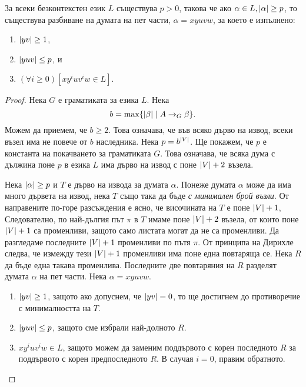 \begin{lemma}
  \label{lem:pumping-context} 
  За всеки безконтекстен език $L$ съществува $p>0$, такова
  че ако $\alpha\in L, \lvert{\alpha}\rvert \geq p$, то съществува разбиване на думата на пет части, $\alpha=xyuvw$,
  за което е изпълнено:
  \begin{enumerate}[1)]
  \item
    $\lvert{yv}\rvert\geq 1$,
  \item
    $\lvert{yuv}\rvert\leq p$, и
  \item
    $(\forall i\geq 0)[xy^iuv^iw\in L]$.
\end{enumerate}
\end{lemma}
\begin{proof}
  Нека $G$ е граматиката за езика $L$.
  Нека \[b = \max\{\lvert{\beta}\rvert \mid A\rightarrow_G \beta\}.\]
  Можем да приемем, че $b \geq 2$.
  Това означава, че във всяко дърво на извод, всеки възел има
  не повече от $b$ наследника.
  Нека $p = b^{\lvert{V}\rvert}$. Ще покажем, че $p$ е константа на покачването за граматиката $G$.
  Това означава, че всяка дума с дължина поне $p$ в езика $L$ има дърво на извод с поне $\lvert{V}\rvert + 2$ възела.
  
  Нека $\lvert{\alpha}\rvert \geq p$ и $T$ е дърво на извода за думата $\alpha$.
  Понеже думата $\alpha$ може да има много дървета на извод, нека $T$ също така да бъде {\em с минимален брой възли}. 
  От направените по-горе разсъждения е ясно, че височината на $T$ е поне $\lvert{V}\rvert + 1$,
  Следователно, по най-дългия път $\pi$ в $T$ имаме поне $\lvert{V}\rvert+2$ възела, от които
  поне $\lvert{V}\rvert+1$ са променливи, защото само листата могат да не са променливи.
  Да разгледаме последните $\lvert{V}\rvert+1$ променливи по пътя $\pi$.
  От принципа на Дирихле следва, че измежду тези $\lvert{V}\rvert+1$ променливи има поне една повтаряща се.
  Нека $R$ да бъде една такава променлива.
  Последните две повтаряния на $R$ разделят думата $\alpha$ на пет части.
  Нека $\alpha = xyuvw$.
  \begin{enumerate}[1)]
  \item
    $\lvert{yv}\rvert\geq 1$,
    защото ако допуснем, че $\lvert{yv}\rvert = 0$,
    то ще достигнем до противоречие с минималността на $T$.
  \item
    $\lvert{yuv}\rvert \leq p$, защото сме избрали най-долното $R$.
  \item
    $xy^iuv^iw \in L$, защото можем да заменим поддървото 
    с корен последното $R$ за поддървото с корен предпоследното $R$.
    В случая $i = 0$, правим обратното.
  \end{enumerate}
\end{proof}

